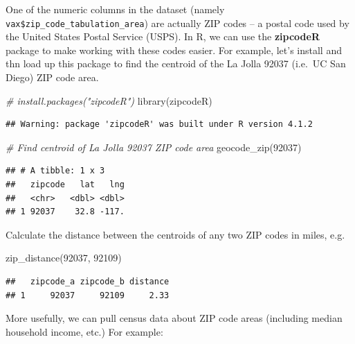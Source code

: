 \documentclass[
]{article}
\newenvironment{Shaded}{\begin{snugshade}}{\end{snugshade}}
\newcommand{\CommentTok}[1]{\textcolor[rgb]{0.56,0.35,0.01}{\textit{#1}}}
\newcommand{\FunctionTok}[1]{\textcolor[rgb]{0.00,0.00,0.00}{#1}}
\newcommand{\NormalTok}[1]{#1}
\newcommand{\StringTok}[1]{\textcolor[rgb]{0.31,0.60,0.02}{#1}}
\begin{document}
One of the numeric columns in the dataset (namely
\texttt{vax\$zip\_code\_tabulation\_area}) are actually ZIP codes -- a
postal code used by the United States Postal Service (USPS). In R, we
can use the \textbf{zipcodeR} package to make working with these codes
easier. For example, let's install and thn load up this package to find
the centroid of the La Jolla 92037 (i.e.~UC San Diego) ZIP code area.

\begin{Shaded}
\begin{Highlighting}[]
\CommentTok{\# install.packages("zipcodeR")}
\FunctionTok{library}\NormalTok{(zipcodeR)}
\end{Highlighting}
\end{Shaded}

\begin{verbatim}
## Warning: package 'zipcodeR' was built under R version 4.1.2
\end{verbatim}

\begin{Shaded}
\begin{Highlighting}[]
\CommentTok{\# Find centroid of La Jolla 92037 ZIP code area}
\FunctionTok{geocode\_zip}\NormalTok{(}\StringTok{\textquotesingle{}92037\textquotesingle{}}\NormalTok{)}
\end{Highlighting}
\end{Shaded}

\begin{verbatim}
## # A tibble: 1 x 3
##   zipcode   lat   lng
##   <chr>   <dbl> <dbl>
## 1 92037    32.8 -117.
\end{verbatim}

Calculate the distance between the centroids of any two ZIP codes in
miles, e.g.

\begin{Shaded}
\begin{Highlighting}[]
\FunctionTok{zip\_distance}\NormalTok{(}\StringTok{\textquotesingle{}92037\textquotesingle{}}\NormalTok{, }\StringTok{\textquotesingle{}92109\textquotesingle{}}\NormalTok{)}
\end{Highlighting}
\end{Shaded}

\begin{verbatim}
##   zipcode_a zipcode_b distance
## 1     92037     92109     2.33
\end{verbatim}

More usefully, we can pull census data about ZIP code areas (including
median household income, etc.) For example:
\end{document}

